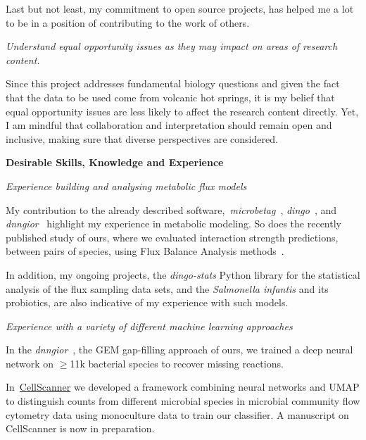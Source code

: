     Last but not least, my commitment to open source projects, has helped me a lot 
    to be in a position of contributing to the work of others. 





\textit{Understand equal opportunity issues as they may impact on areas of research content.}

    Since this project addresses fundamental biology questions 
    and given the fact that the data to be used come from volcanic hot springs,
    it is my belief that equal opportunity issues are less likely to affect the research content directly.
    Yet, I am mindful that collaboration and interpretation should remain open and inclusive, 
    making sure that diverse perspectives are considered.


\textbf{Desirable Skills, Knowledge and Experience }

\textit{Experience building and analysing metabolic flux models}

    My contribution to the already described software,~\textit{microbetag}~\cite{zafeiropoulos2024microbetag},
    \textit{dingo}~\cite{chalkis2024dingo}, and
    \textit{dnngior}~\cite{boer2024improving}
    highlight my experience in metabolic modeling.
    So does the recently published study of ours, where we evaluated
    interaction strength predictions, between pairs of species, using Flux Balance Analysis methods~\cite{joseph2024predicting}.

    In addition, my ongoing projects, the \textit{dingo-stats} Python library for the statistical 
    analysis of the flux sampling data sets, and the \textit{Salmonella infantis} and its probiotics,
    are also indicative of my experience with such models.





\textit{Experience with a variety of different machine learning approaches}

    In the \textit{dnngior}~\cite{boer2024improving}, the GEM gap-filling approach of ours, 
    we trained a deep neural network on $\geq$11k bacterial species to recover missing reactions.
    
    In~\href{https://github.com/msysbio/CellScanner/tree/dev}{CellScanner}
    we developed a framework combining neural networks and UMAP 
    to distinguish counts from different microbial species in microbial community flow cytometry data
    using monoculture data to train our classifier.
    A manuscript on CellScanner is now in preparation.


